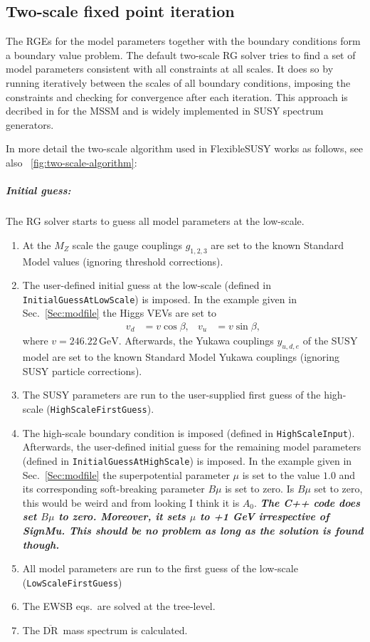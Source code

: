 \documentclass[final,3p,11pt,pdflatex]{elsarticle}
\makeatletter
\newcommand{\fs}{FlexibleSUSY\@\xspace}
\newcommand{\code}[1]{\lstinline|#1|}  %
\newcommand{\textoverline}[1]{$\overline{\mbox{#1}}$}
\newcommand{\DRbar}{\textoverline{DR}\xspace}
\newcommand{\unit}[1]{\,\text{#1}}      %
\newcommand{\figref}[1]{\figurename~\ref{#1}}
\newcommand{\secref}[1]{Sec.~\ref{#1}}
\newcommand{\JHrem}[1]{\textcolor[rgb]{1,.3,0}{\textbf{{\textsl{\boldmath #1}}}}}
\makeatother
\begin{document}
\subsection{Two-scale fixed point iteration}
\label{sec:TwoScaleFixedPointIteration}

The RGEs for the model parameters together with the boundary
conditions form a boundary value problem.  The default two-scale RG
solver tries to find a set of model parameters consistent with all
constraints at all scales.  It does so by running iteratively between
the scales of all boundary conditions, imposing the constraints and
checking for convergence after each iteration.  This approach is
decribed in \cite{Barger:1993gh} for the MSSM and is widely
implemented in SUSY spectrum generators.

In more detail the two-scale algorithm used in \fs works as
follows, see also \figref{fig:two-scale-algorithm}:
%
\subparagraph{Initial guess:} The RG solver starts to guess all model
parameters at the low-scale.
%
\begin{enumerate}
\item At the $M_Z$ scale the gauge couplings $g_{1,2,3}$ are set to
  the known Standard Model values (ignoring threshold corrections).
\item The user-defined initial guess at the low-scale (defined in
  \code{InitialGuessAtLowScale}) is imposed.  In the example given in
  \secref{Sec:modfile} the Higgs VEVs are set to
  \begin{align}
    v_d &= v \cos\beta, & v_u &= v \sin\beta ,
  \end{align}
  where $v=246.22\unit{GeV}$.  Afterwards, the Yukawa couplings
  $y_{u,d,e}$ of the SUSY model are set to the known Standard Model
  Yukawa couplings (ignoring SUSY particle corrections).
\item The SUSY parameters are run to the user-supplied first guess of
  the high-scale (\code{HighScaleFirstGuess}).
\item The high-scale boundary condition is imposed (defined in
  \code{HighScaleInput}).  Afterwards, the user-defined initial guess
  for the remaining model parameters (defined in
  \code{InitialGuessAtHighScale}) is imposed.  In the example given in
  \secref{Sec:modfile} the superpotential parameter $\mu$ is set to
  the value $1.0$ and its corresponding soft-breaking parameter $B\mu$
  is set to zero. {\color{red} Is $B\mu$ set to zero, this would be weird and from looking I think it is $A_0$.}
  \JHrem{The C++ code does set $B\mu$ to zero.  Moreover, it sets $\mu$ to +1 GeV irrespective of SignMu.  This should be no problem as long as the solution is found though.}
\item All model parameters are run to the first guess of the low-scale
  (\code{LowScaleFirstGuess})
\item The EWSB eqs.\ are solved at the tree-level.
\item The \DRbar\ mass spectrum is calculated.
\end{enumerate}
\end{document}
